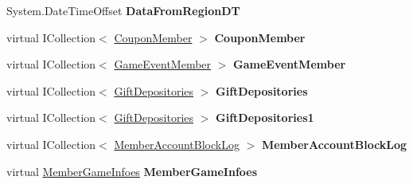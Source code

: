 \begin{DoxyCompactItemize}
\item 
System.\+Date\+Time\+Offset {\bfseries Data\+From\+Region\+DT}\hypertarget{a00145_a4c9c5be7d5610128c061dafc0d3c75b5}{}\label{a00145_a4c9c5be7d5610128c061dafc0d3c75b5}

\item 
virtual I\+Collection$<$ \hyperlink{a00069}{Coupon\+Member} $>$ {\bfseries Coupon\+Member}\hypertarget{a00145_ae5dacca4b47660d899d6da2bee998778}{}\label{a00145_ae5dacca4b47660d899d6da2bee998778}

\item 
virtual I\+Collection$<$ \hyperlink{a00081}{Game\+Event\+Member} $>$ {\bfseries Game\+Event\+Member}\hypertarget{a00145_a0d9e7ec9fe15a919eee2a85519ca6085}{}\label{a00145_a0d9e7ec9fe15a919eee2a85519ca6085}

\item 
virtual I\+Collection$<$ \hyperlink{a00086}{Gift\+Depositories} $>$ {\bfseries Gift\+Depositories}\hypertarget{a00145_a2df951c86ce432ed1abd9751a15b9c5c}{}\label{a00145_a2df951c86ce432ed1abd9751a15b9c5c}

\item 
virtual I\+Collection$<$ \hyperlink{a00086}{Gift\+Depositories} $>$ {\bfseries Gift\+Depositories1}\hypertarget{a00145_aa08a2b987d81bb1d5922131c6dfd4688}{}\label{a00145_aa08a2b987d81bb1d5922131c6dfd4688}

\item 
virtual I\+Collection$<$ \hyperlink{a00135}{Member\+Account\+Block\+Log} $>$ {\bfseries Member\+Account\+Block\+Log}\hypertarget{a00145_aadb2ec5890d0df03ac694519c028fd36}{}\label{a00145_aadb2ec5890d0df03ac694519c028fd36}

\item 
virtual \hyperlink{a00137}{Member\+Game\+Infoes} {\bfseries Member\+Game\+Infoes}\hypertarget{a00145_abf3c7db64a5cbb3e4e97098cafabc9ba}{}\label{a00145_abf3c7db64a5cbb3e4e97098cafabc9ba}


\end{DoxyCompactItemize}
